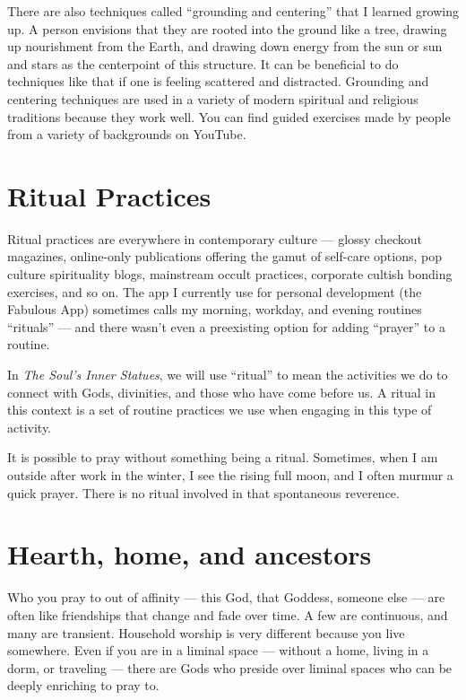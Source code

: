 \documentclass[
]{book}
\begin{document}
There are also techniques called ``grounding and centering'' that I learned growing up. A person envisions that they are rooted into the ground like a tree, drawing up nourishment from the Earth, and drawing down energy from the sun or sun and stars as the centerpoint of this structure. It can be beneficial to do techniques like that if one is feeling scattered and distracted. Grounding and centering techniques are used in a variety of modern spiritual and religious traditions because they work well. You can find guided exercises made by people from a variety of backgrounds on YouTube.

\hypertarget{ritual-practices}{%
\section{Ritual Practices}\label{ritual-practices}}

Ritual practices are everywhere in contemporary culture --- glossy checkout magazines, online-only publications offering the gamut of self-care options, pop culture spirituality blogs, mainstream occult practices, corporate cultish bonding exercises, and so on. The app I currently use for personal development (the Fabulous App) sometimes calls my morning, workday, and evening routines ``rituals'' --- and there wasn't even a preexisting option for adding ``prayer'' to a routine.

In \emph{The Soul's Inner Statues}, we will use ``ritual'' to mean the activities we do to connect with Gods, divinities, and those who have come before us. A ritual in this context is a set of routine practices we use when engaging in this type of activity.

It is possible to pray without something being a ritual. Sometimes, when I am outside after work in the winter, I see the rising full moon, and I often murmur a quick prayer. There is no ritual involved in that spontaneous reverence.

\hypertarget{hearth-home-and-ancestors}{%
\section{Hearth, home, and ancestors}\label{hearth-home-and-ancestors}}

Who you pray to out of affinity --- this God, that Goddess, someone else --- are often like friendships that change and fade over time. A few are continuous, and many are transient. Household worship is very different because you live somewhere. Even if you are in a liminal space --- without a home, living in a dorm, or traveling --- there are Gods who preside over liminal spaces who can be deeply enriching to pray to.
\end{document}
